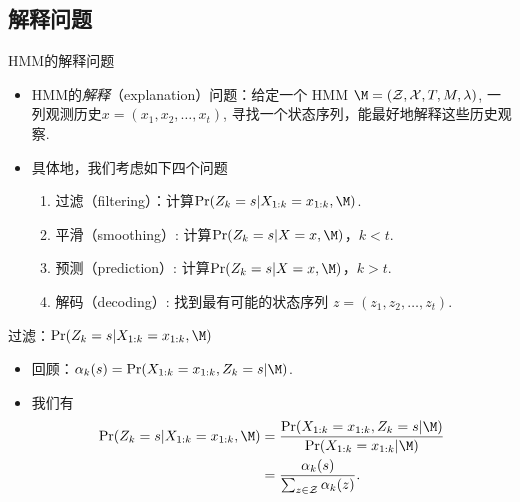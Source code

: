 \subsection{解释问题}
\begin{frame}{HMM的解释问题}
    \begin{itemize}
    \item HMM的\emph{解释}（explanation）问题：给定一个 HMM $\M = (\mathcal Z, \mathcal X, T, M, \lambda)$, 一列观测历史$x = (x_1, x_2, \dots, x_t)$, 寻找一个状态序列，能最好地解释这些历史观察.
    \item 具体地，我们考虑如下四个问题
    \begin{enumerate}
        \item 过滤（filtering）：计算$\Pr(Z_k = s|X_{1:k}=x_{1:k}, \M)$.
        \item 平滑（smoothing）: 计算$\Pr(Z_k = s|X=x, \M)$，$k < t$.
        \item 预测（prediction）: 计算$\Pr(Z_k = s|X=x, \M)$，$k > t$.
        \item 解码（decoding）: 找到最有可能的状态序列 $z = (z_1, z_2, \dots, z_t)$.
    \end{enumerate}
\end{itemize}
\end{frame}



\begin{frame}{过滤：$\Pr(Z_k = s|X_{1:k}=x_{1:k}, \M)$}
\begin{itemize}
    \item 回顾：$\alpha_k(s)= \Pr(X_{1:k}=x_{1:k}, Z_k=s| \M)$. 
    \item 我们有
    \begin{align*}
        \Pr(Z_k = s|X_{1:k}=x_{1:k}, \M) & = \frac{\Pr(X_{1:k}=x_{1:k}, Z_k=s| \M)}{\Pr(X_{1:k}=x_{1:k}| \M)} \\
        &= \frac{\alpha_k(s)}{\sum_{z\in\mathcal Z}\alpha_k(z)}.
    \end{align*}
\end{itemize}
\end{frame}

